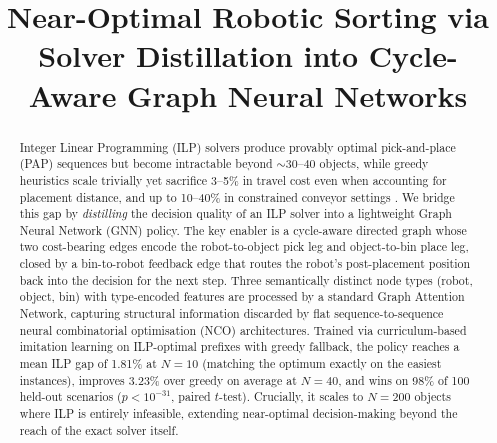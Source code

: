 \documentclass[conference]{IEEEtran}
\begin{document}
\title{\textbf{Near-Optimal Robotic Sorting via Solver Distillation into Cycle-Aware Graph Neural Networks}}

\author{
\and
{}
\and
{}
}

\maketitle

\begin{abstract}
Integer Linear Programming (ILP) solvers produce provably optimal pick-and-place (PAP) sequences but become intractable beyond ${\sim}30$--$40$ objects, while greedy heuristics scale trivially yet sacrifice 3--5\% in travel cost even when accounting for placement distance, and up to 10--40\% in constrained conveyor settings \cite{han2019pap}. We bridge this gap by \emph{distilling} the decision quality of an ILP solver into a lightweight Graph Neural Network (GNN) policy. The key enabler is a cycle-aware directed graph whose two cost-bearing edges encode the robot-to-object pick leg and object-to-bin place leg, closed by a bin-to-robot feedback edge that routes the robot's post-placement position back into the decision for the next step. Three semantically distinct node types (robot, object, bin) with type-encoded features are processed by a standard Graph Attention Network, capturing structural information discarded by flat sequence-to-sequence neural combinatorial optimisation (NCO) architectures. Trained via curriculum-based imitation learning on ILP-optimal prefixes with greedy fallback, the policy reaches a mean ILP gap of 1.81\% at $N{=}10$ (matching the optimum exactly on the easiest instances), improves 3.23\% over greedy on average at $N{=}40$, and wins on 98\% of 100 held-out scenarios ($p < 10^{-31}$, paired $t$-test). Crucially, it scales to $N{=}200$ objects where ILP is entirely infeasible, extending near-optimal decision-making beyond the reach of the exact solver itself.
\end{abstract}
\end{document}
